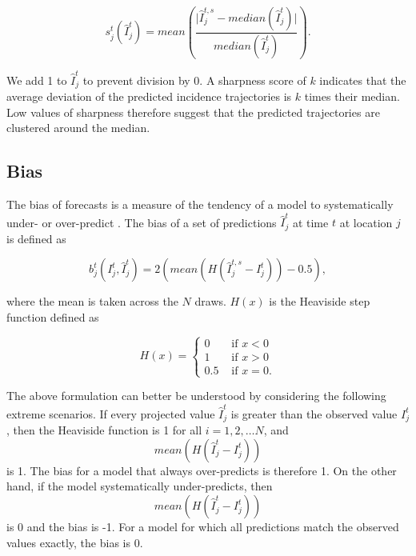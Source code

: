 \documentclass[9pt,twocolumn,twoside,lineno]{pnas-new}
\begin{document}
{\begin{equation*}
s_{j}^{t}(\hat{I}_{j}^{t}) = 
mean 
\left(
\frac{\lvert \hat{I}_{j}^{t, s} - median(\hat{I}_{j}^{t}) \rvert} 
{median(\hat{I}_{j}^{t})} 
\right).
\end{equation*}

We add 1 to \(\hat{I}_{j}^{t}\) to prevent division by 0. A sharpness
score of \(k\) indicates that the average deviation of the predicted
incidence trajectories is \(k\) times their median. Low values of
sharpness therefore suggest that the predicted trajectories are
clustered around the median.


\subsection*{Bias}\label{bias}

The bias of forecasts is a measure of the tendency of a model to
systematically under- or over-predict \cite{funk2017assessing}. The bias
of a set of predictions $\hat{I}_{j}^{t}$ at time \(t\) at
location \(j\) is defined as

\begin{equation*}
b_{j}^{t}(I_{j}^{t}, \hat{I}_{j}^{t}) = 
2 \left( mean \left( H \left (\hat{I}_{j}^{t, s} - I_{j}^{t} \right)
\right) - 0.5 \right),
\end{equation*}

where the mean is taken across the \(N\) draws. \(H(x)\) is the Heaviside
step function defined as

\begin{equation*}
H(x) = \begin{cases} 
0 & \text{ if } x < 0 \\ 
1 & \text{ if } x > 0 \\
0.5 & \text{ if } x = 0. 
\end{cases} 
\end{equation*}

The above formulation can better be understood by considering the
following extreme scenarios. If every projected value
$\hat{I}_{j}^{t}$ is greater than the observed value
$I_{j}^{t}$, then the Heaviside function is 1 for all $i = 1, 2,
\dots N$, and 
\[ mean\left( H \left( \hat{I}_{j}^{t} - I_j^t \right) \right) \]
is 1. The bias for a model that always over-predicts
is therefore 1. On the other hand, if the model systematically
under-predicts, then
\[ mean\left( H \left( \hat{I}_{j}^{t} - I_j^t \right) \right) \]
is 0 and the bias is -1. For a model for which all
predictions match the observed values exactly, the bias is 0.

}
\end{document}
